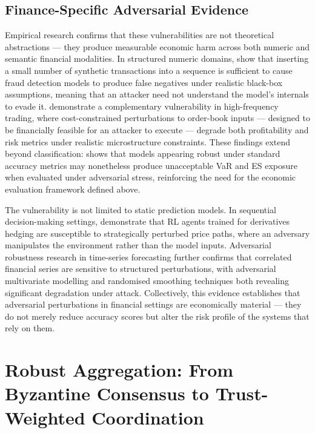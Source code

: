 \subsection{Finance-Specific Adversarial Evidence}
Empirical research confirms that these vulnerabilities are not theoretical abstractions — they produce measurable economic harm across both numeric and semantic financial modalities. In structured numeric domains, \cite{fursov_adversarial_2021} show that inserting a small number of synthetic transactions into a sequence is sufficient to cause fraud detection models to produce false negatives under realistic black-box assumptions, meaning that an attacker need not understand the model's internals to evade it. \cite{goldblum_adversarial_2021} demonstrate a complementary vulnerability in high-frequency trading, where cost-constrained perturbations to order-book inputs — designed to be financially feasible for an attacker to execute — degrade both profitability and risk metrics under realistic microstructure constraints. These findings extend beyond classification: \cite{baviskar2025robust} shows that models appearing robust under standard accuracy metrics may nonetheless produce unacceptable VaR and ES exposure when evaluated under adversarial stress, reinforcing the need for the economic evaluation framework defined above.

The vulnerability is not limited to static prediction models. In sequential decision-making settings, \cite{buehler2020deephedging} demonstrate that RL agents trained for derivatives hedging are susceptible to strategically perturbed price paths, where an adversary manipulates the environment rather than the model inputs. Adversarial robustness research in time-series forecasting further confirms that correlated financial series are sensitive to structured perturbations, with adversarial multivariate modelling \cite{xu2024mts, chen_diversity_2024-1} and randomised smoothing techniques both revealing significant degradation under attack. Collectively, this evidence establishes that adversarial perturbations in financial settings are economically material — they do not merely reduce accuracy scores but alter the risk profile of the systems that rely on them.

\section{Robust Aggregation: From Byzantine Consensus to Trust-Weighted Coordination} \label{sec:robust-agg}

